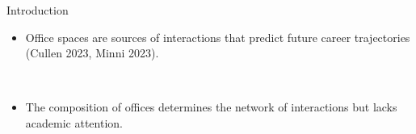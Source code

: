 \begin{frame}{Introduction}
\begin{itemize}
    \item Office spaces are sources of interactions that predict future career trajectories (Cullen 2023, Minni 2023).

    \

    \item The composition of offices determines the network of interactions but lacks academic attention. 
\end{itemize}
\end{frame}